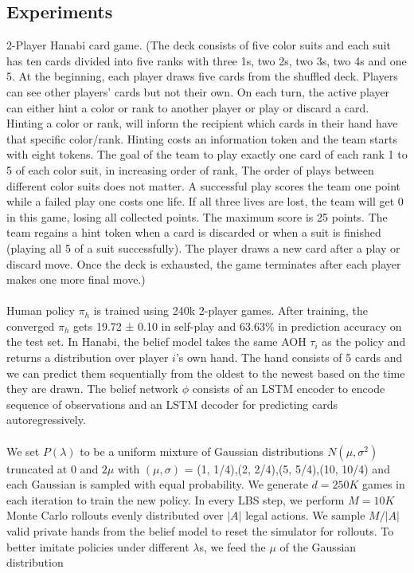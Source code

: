 \documentclass[12pt]{article}
\begin{document}
\subsection{Experiments}
2-Player Hanabi card game. (The deck
consists of five color suits and each suit has ten cards divided into five ranks with three 1s, two 2s,
two 3s, two 4s and one 5. At the beginning, each player draws five cards from the shuffled deck.
Players can see other players’ cards but not their own. On each turn, the active player can either hint
a color or rank to another player or play or discard a card. Hinting a color or rank, will inform the
recipient which cards in their hand have that specific color/rank. Hinting costs an information token
and the team starts with eight tokens. The goal of the team to play exactly one card of each rank 1
to 5 of each color suit, in increasing order of rank, The order of plays between different color suits
does not matter. A successful play scores the team one point while a failed play one costs one life.
If all three lives are lost, the team will get 0 in this game, losing all collected points. The maximum
score is 25 points. The team regains a hint token when a card is discarded or when a suit is finished
(playing all 5 of a suit successfully). The player draws a new card after a play or discard move.
Once the deck is exhausted, the game terminates after each player makes one more final move.)\\
\\
Human policy $\pi_h$ is trained using 240k 2-player games. After training, the converged $\pi_h$ gets 19.72 ± 0.10 in self-play and 63.63\% in prediction
accuracy on the test set. In Hanabi, the belief model takes the same
AOH $\tau_i$
as the policy and returns a distribution over player $i$'s own hand. The hand consists of 5 cards and we can predict them sequentially from the oldest to the newest based on the time they
are drawn. The belief network $\phi$ consists of an LSTM encoder to encode sequence of observations
and an LSTM decoder for predicting cards autoregressively.\\
\\
We set $P(\lambda)$ to be a uniform mixture of Gaussian distributions $N (\mu, \sigma^2
)$ truncated at $0$ and $2\mu$ with $(\mu, \sigma)$ =
(1, 1/4),(2, 2/4),(5, 5/4),(10, 10/4) and each Gaussian is sampled with equal probability. We
generate $d = 250K$ games in each iteration to train the new policy. In every LBS step,
we perform $M = 10K$ Monte Carlo rollouts evenly distributed over $|A|$ legal actions. We sample $M/|A|$ valid private hands from the belief model to reset the simulator for rollouts. To better imitate policies under different $\lambda$s, we feed the $\mu$ of the Gaussian distribution
\end{document}
